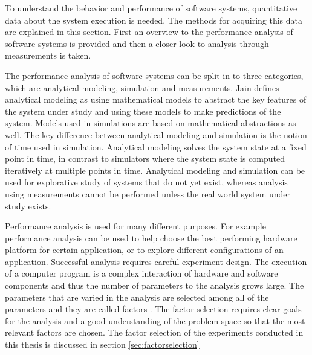 To understand the behavior and performance of software systems, quantitative data about the system execution is needed. The methods for acquiring this data are explained in this section. First an overview to the performance analysis of software systems is provided and then a closer look to analysis through measurements is taken.

The performance analysis of software systems can be split in to three categories, which are analytical modeling, simulation and measurements. Jain \cite{jain1991art} defines analytical modeling as using mathematical models to abstract the key features of the system under study and using these models to make predictions of the system. Models used in simulations are based on mathematical abstractions as well. The key difference between analytical modeling and simulation is the notion of time used in simulation. Analytical modeling solves the system state at a fixed point in time, in contrast to simulators where the system state is computed iteratively at multiple points in time. Analytical modeling and simulation can be used for explorative study of systems that do not yet exist, whereas analysis using measurements cannot be performed unless the real world system under study exists. \cite{jain1991art}


Performance analysis is used for many different purposes. For example performance analysis can be used to help choose the best performing hardware platform for certain application, or to explore different configurations of an application. Successful analysis requires careful experiment design. The execution of a computer program is a complex interaction of hardware and software components and thus the number of parameters to the analysis grows large. The parameters that are varied in the analysis are selected among all of the parameters and they are called factors \cite{jain1991art}. The factor selection requires clear goals for the analysis and a good understanding of the problem space so that the most relevant factors are chosen. The factor selection of the experiments conducted in this thesis is discussed in section \ref{sec:factorselection}
